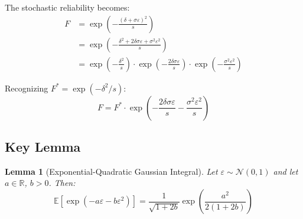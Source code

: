\documentclass[11pt,a4paper]{article}
\newtheorem{lemma}[theorem]{Lemma}
\theoremstyle{definition}
\newcommand{\E}{\mathbb{E}}
\newcommand{\R}{\mathbb{R}}
\newcommand{\N}{\mathcal{N}}
\begin{document}
The stochastic reliability becomes:
\begin{align}
    F &= \exp\left(-\frac{(\delta + \sigma\varepsilon)^2}{s}\right) \\
    &= \exp\left(-\frac{\delta^2 + 2\delta\sigma\varepsilon + \sigma^2\varepsilon^2}{s}\right) \\
    &= \exp\left(-\frac{\delta^2}{s}\right) \cdot \exp\left(-\frac{2\delta\sigma\varepsilon}{s}\right) \cdot \exp\left(-\frac{\sigma^2\varepsilon^2}{s}\right)
\end{align}

Recognizing $F^* = \exp(-\delta^2/s)$:
\begin{equation}
    F = F^* \cdot \exp\left(-\frac{2\delta\sigma\varepsilon}{s} - \frac{\sigma^2\varepsilon^2}{s}\right)
\end{equation}

\subsection{Key Lemma}

\begin{lemma}[Exponential-Quadratic Gaussian Integral]
\label{lem:gaussian-integral}
Let $\varepsilon \sim \N(0, 1)$ and let $a \in \R$, $b > 0$. Then:
\begin{equation}
    \E\left[\exp\left(-a\varepsilon - b\varepsilon^2\right)\right] = \frac{1}{\sqrt{1 + 2b}} \exp\left(\frac{a^2}{2(1 + 2b)}\right)
\end{equation}
\end{lemma}
\end{document}
